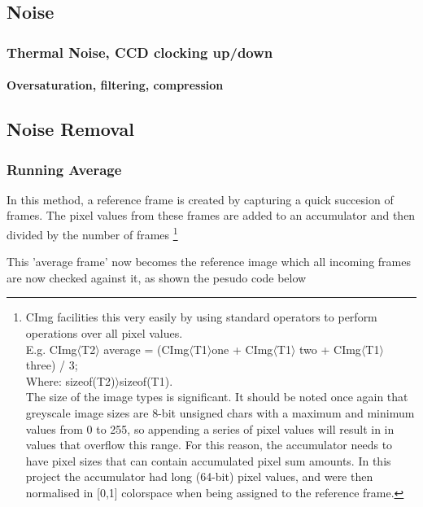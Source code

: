 \documentclass[11pt]{article} %
\begin{document}
\subsection{Noise}
\subsubsection{Thermal Noise, CCD clocking up/down}
\paragraph{Oversaturation, filtering, compression}

\subsection {Noise Removal}
\subsubsection{Running Average}
In this method, a reference frame is created by capturing a quick succesion of frames. The pixel values from these frames are added to an accumulator and then divided by the number of frames  
\footnote{CImg facilities this very easily by using standard operators to perform operations over all pixel values.
\\ E.g.  CImg\(\langle\)T2\(\rangle\) average =  (CImg\(\langle\)T1\(\rangle\)one + CImg\(\langle\)T1\(\rangle\) two + CImg\(\langle\)T1\(\rangle\) three) / 3; \\
Where: sizeof(T2)\(\rangle\)sizeof(T1).
\\The size of the image types is significant. It should be noted once again that greyscale image sizes are 8-bit unsigned chars with a maximum and minimum values from 0 to 255, so appending a series of pixel values will result in in values that overflow this range. For this reason, the accumulator needs to have pixel sizes that can contain accumulated pixel sum amounts. In this project the accumulator had long (64-bit) pixel values, and were then normalised in [0,1] colorspace when being assigned to the reference frame.}
 
This 'average frame' now becomes the reference image which all incoming frames are now checked against it, as shown the pesudo code below

\begin{frame}[fragile]
	\vspace{-20pt}
	
\end{frame}
\end{document}
